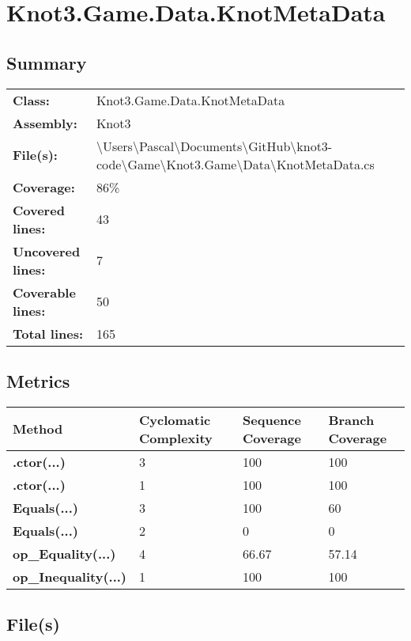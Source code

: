 \documentclass[a4paper,10pt]{article}
\begin{document}
\section{Knot3.Game.Data.KnotMetaData}
\subsection{Summary}
\begin{longtable}[l]{ll}
\textbf{Class:} & Knot3.Game.Data.KnotMetaData\\
\textbf{Assembly:} & Knot3\\
\textbf{File(s):} & \begin{minipage}[t]{12cm}{\textbackslash Users\textbackslash Pascal\textbackslash Documents\textbackslash GitHub\textbackslash knot3-code\textbackslash Game\textbackslash Knot3.Game\textbackslash Data\textbackslash KnotMetaData.cs}\end{minipage} \\
\textbf{Coverage:} & 86\%\\
\textbf{Covered lines:} & 43\\
\textbf{Uncovered lines:} & 7\\
\textbf{Coverable lines:} & 50\\
\textbf{Total lines:} & 165\\
\end{longtable}
\subsection{Metrics}
\begin{longtable}[l]{|l|l|l|l|}
\hline
\textbf{Method} & \textbf{Cyclomatic Complexity} & \textbf{Sequence Coverage} & \textbf{Branch Coverage}\\
\hline
\textbf{.ctor(...)} & 3 & 100 & 100\\
\hline
\textbf{.ctor(...)} & 1 & 100 & 100\\
\hline
\textbf{Equals(...)} & 3 & 100 & 60\\
\hline
\textbf{Equals(...)} & 2 & 0 & 0\\
\hline
\textbf{op\_Equality(...)} & 4 & 66.67 & 57.14\\
\hline
\textbf{op\_Inequality(...)} & 1 & 100 & 100\\
\hline
\end{longtable}
\subsection{File(s)}
\end{document}
